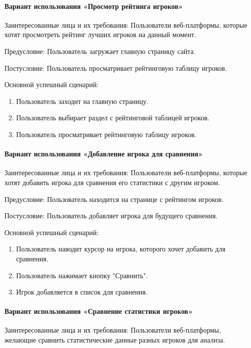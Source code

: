 \paragraph{Вариант использования «Просмотр рейтинга игроков»}

Заинтересованные лица и их требования: Пользователи веб-платформы, которые хотят просмотреть рейтинг лучших игроков на данный момент.

Предусловие: Пользователь загружает главную страницу сайта.

Постусловие: Пользователь просматривает рейтинговую таблицу игроков.

Основной успешный сценарий:
\begin{enumerate}
	\item Пользователь заходит на главную страницу.
	\item Пользователь выбирает раздел с рейтинговой таблицей игроков.
	\item Пользователь просматривает рейтинговую таблицу игроков.
\end{enumerate}

\paragraph{Вариант использования «Добавление игрока для сравнения»}

Заинтересованные лица и их требования: Пользователи веб-платформы, которые хотят добавить игрока для сравнения его статистики с другим игроком.

Предусловие: Пользователь находится на странице с рейтингом игроков.

Постусловие: Пользователь добавляет игрока для будущего сравнения.

Основной успешный сценарий:
\begin{enumerate}
	\item Пользователь наводит курсор на игрока, которого хочет добавить для сравнения.
	\item Пользователь нажимает кнопку "Сравнить".
	\item Игрок добавляется в список для сравнения.
\end{enumerate}

\paragraph{Вариант использования «Сравнение статистики игроков»}

Заинтересованные лица и их требования: Пользователи веб-платформы, желающие сравнить статистические данные разных игроков для анализа.

